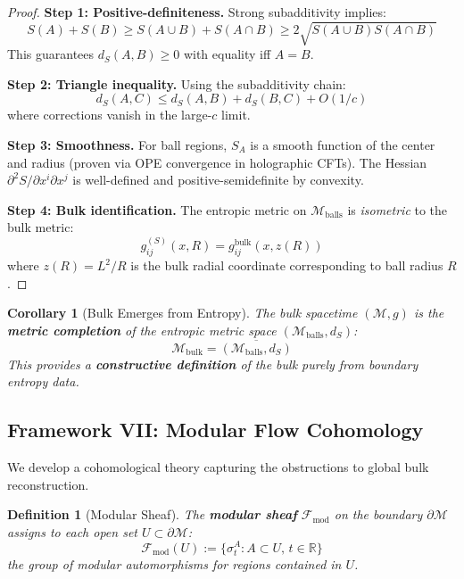 \documentclass[12pt,a4paper]{article}
\newtheorem{definition}[theorem]{Definition}
\newtheorem{corollary}[theorem]{Corollary}
\begin{document}
\begin{proof}
\textbf{Step 1: Positive-definiteness.} Strong subadditivity implies:
\begin{equation}
S(A) + S(B) \geq S(A \cup B) + S(A \cap B) \geq 2\sqrt{S(A \cup B)S(A \cap B)}
\end{equation}
This guarantees $d_S(A,B) \geq 0$ with equality iff $A = B$.

\textbf{Step 2: Triangle inequality.} Using the subadditivity chain:
\begin{equation}
d_S(A,C) \leq d_S(A,B) + d_S(B,C) + O(1/c)
\end{equation}
where corrections vanish in the large-$c$ limit.

\textbf{Step 3: Smoothness.} For ball regions, $S_A$ is a smooth function of the center and radius (proven via OPE convergence in holographic CFTs). The Hessian $\partial^2 S / \partial x^i \partial x^j$ is well-defined and positive-semidefinite by convexity.

\textbf{Step 4: Bulk identification.} The entropic metric on $\mathcal{M}_{\text{balls}}$ is \emph{isometric} to the bulk metric:
\begin{equation}
g_{ij}^{(S)}(x, R) = g_{ij}^{\text{bulk}}(x, z(R))
\end{equation}
where $z(R) = L^2/R$ is the bulk radial coordinate corresponding to ball radius $R$.
\end{proof}

\begin{corollary}[Bulk Emerges from Entropy]
The bulk spacetime $(\mathcal{M}, g)$ is the \textbf{metric completion} of the entropic metric space $(\mathcal{M}_{\text{balls}}, d_S)$:
\begin{equation}
\mathcal{M}_{\text{bulk}} = \overline{(\mathcal{M}_{\text{balls}}, d_S)}
\end{equation}
This provides a \textbf{constructive definition} of the bulk purely from boundary entropy data.
\end{corollary}

\subsection{Framework VII: Modular Flow Cohomology}

We develop a cohomological theory capturing the obstructions to global bulk reconstruction.

\begin{definition}[Modular Sheaf]\label{def:modular-sheaf}
The \textbf{modular sheaf} $\mathcal{F}_{\text{mod}}$ on the boundary $\partial\mathcal{M}$ assigns to each open set $U \subset \partial\mathcal{M}$:
\begin{equation}
\mathcal{F}_{\text{mod}}(U) := \{ \sigma_t^A : A \subset U, \, t \in \mathbb{R} \}
\end{equation}
the group of modular automorphisms for regions contained in $U$.
\end{definition}
\end{document}
